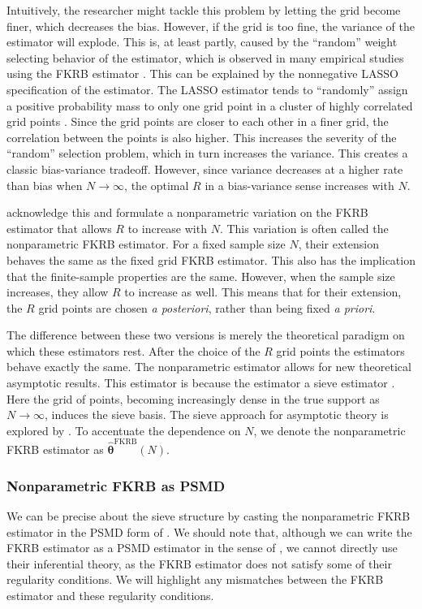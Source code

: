 Intuitively, the researcher might tackle this problem by letting the grid become finer, which decreases the bias.
However, if the grid is too fine, the variance of the estimator will explode.
This is, at least partly, caused by the ``random'' weight selecting behavior of the estimator, which is observed in many empirical studies using the FKRB estimator \citep[such as][]{NevoTurnerWilliams2016,IllanesPadi2019,BlundellGowrisankaranLanger2020}.
This can be explained by the nonnegative LASSO specification of the estimator.
The LASSO estimator tends to ``randomly'' assign a positive probability mass to only one grid point in a cluster of highly correlated grid points \citep{HeissHetzeneckerOsterhaus2022}.
Since the grid points are closer to each other in a finer grid, the correlation between the points is also higher.
This increases the severity of the ``random'' selection problem, which in turn increases the variance.
This creates a classic bias-variance tradeoff.
However, since variance decreases at a higher rate than bias when $N \to \infty$, the optimal $R$ in a bias-variance sense increases with $N$.

\citet{FoxKimYang2016} acknowledge this and formulate a nonparametric variation on the FKRB estimator that allows $R$ to increase with $N$.
This variation is often called the nonparametric FKRB estimator.
For a fixed sample size $N$, their extension behaves the same as the fixed grid FKRB estimator.
This also has the implication that the finite-sample properties are the same.
However, when the sample size increases, they allow $R$ to increase as well.
This means that for their extension, the $R$ grid points are chosen \textit{a posteriori}, rather than being fixed \textit{a priori}.

The difference between these two versions is merely the theoretical paradigm on which these estimators rest.
After the choice of the $R$ grid points the estimators behave exactly the same.
The nonparametric estimator allows for new theoretical asymptotic results.
This estimator is because the estimator a sieve estimator \citep[see][]{Chen2007}.
Here the grid of points, becoming increasingly dense in the true support as $N \to \infty$, induces the sieve basis.
The sieve approach for asymptotic theory is explored by \citet{FoxKimYang2016}.
To accentuate the dependence on $N$, we denote the nonparametric FKRB estimator as $\hat{\bm{\theta}}^{\mathrm{FKRB}}(N)$.

\subsubsection{Nonparametric FKRB as PSMD}
\label{sec:FKRBasPSMD}
We can be precise about the sieve structure by casting the nonparametric FKRB estimator in the PSMD form of \citet{ChenPouzo2012,ChenPouzo2015}.
We should note that, although we can write the FKRB estimator as a PSMD estimator in the sense of \citet{ChenPouzo2015}, we cannot directly use their inferential theory, as the FKRB estimator does not satisfy some of their regularity conditions.
We will highlight any mismatches between the FKRB estimator and these regularity conditions.

